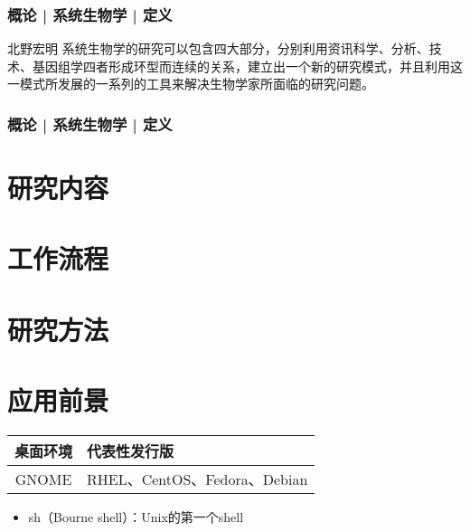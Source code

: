 \begin{frame}[label=current]
  \frametitle{概论 | 系统生物学 | 定义}
  \begin{block}{北野宏明}
系统生物学的研究可以包含四大部分，分别利用资讯科学、分析、技术、基因组学四者形成环型而连续的关系，建立出一个新的研究模式，并且利用这一模式所发展的一系列的工具来解决生物学家所面临的研究问题。
  \end{block}
\end{frame}

\begin{frame}[label=current]
  \frametitle{概论 | 系统生物学 | 定义}
\end{frame}

\section{研究内容}

\section{工作流程}

\section{研究方法}

\section{应用前景}



  \begin{table}
    \centering
    \begin{tabular}{cl}
      \hline
      \rowcolor{blue!50}桌面环境 & 代表性发行版\\
      \hline
      GNOME & RHEL、CentOS、Fedora、Debian\\
      \hline
    \end{tabular}
  \end{table}

  \begin{itemize}[<+->]
    \item sh（Bourne shell）：Unix的第一个shell
  \end{itemize}

